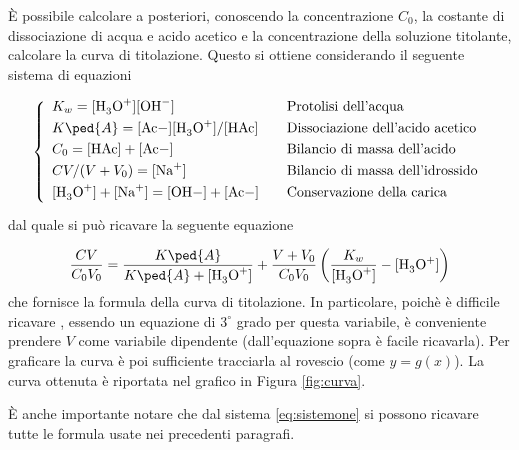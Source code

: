 È possibile calcolare a posteriori, conoscendo la concentrazione $C_0$, la costante di dissociazione di
acqua e acido acetico e la concentrazione della soluzione titolante, calcolare la curva di titolazione.
Questo si ottiene considerando il seguente sistema di equazioni

\begin{equation}
    \left\{
    \begin{array}{l @\qquad l} \smallskip
        K_w = [\ce{H3O+}][\ce{OH-}] & \text{Protolisi dell'acqua} \\ \smallskip
        K\ped{A} = [\ce{Ac-]}[\ce{H3O+}]/[\ce{HAc}] & \text{Dissociazione dell'acido acetico} \\ \smallskip
        C_0 = \ce{[HAc] + [Ac-]} & \text{Bilancio di massa dell'acido} \\ \smallskip
        CV/(V + V_0) = [\ce{Na+}] & \text{Bilancio di massa dell'idrossido} \\ \smallskip
        \ce{[H3O+] + [Na+] = [OH-] + [Ac-]} & \text{Conservazione della carica} \\
    \end{array}
    \right.
    \label{eq:sistemone}
\end{equation}
%
dal quale si può ricavare la seguente equazione

\begin{equation}
    \frac{CV}{C_0V_0} = \frac{K\ped{A}}{K\ped{A} + \ce{[H3O+]}} + \frac{V + V_0}{C_0V_0} \left(\frac{K_w}{\ce{[H3O+]}} - \ce{[H3O+]} \right)
    \label{eq:curv}
\end{equation}
%
che fornisce la formula della curva di titolazione. In particolare, poichè è difficile ricavare \ce{[H3O+]}, essendo
un equazione di $3^\circ$ grado per questa variabile, è conveniente prendere $V$ come variabile dipendente 
(dall'equazione sopra è facile ricavarla). Per graficare la curva è poi sufficiente tracciarla al rovescio (come $y = g(x)$).
La curva ottenuta è riportata nel grafico in Figura \ref{fig:curva}.

È anche importante notare che dal sistema \eqref{eq:sistemone} si possono ricavare tutte le formula usate nei precedenti
paragrafi.
